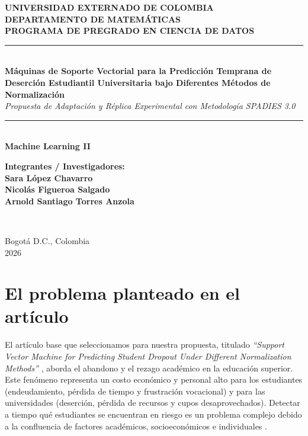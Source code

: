 \documentclass[12pt,a4paper]{article}
\begin{document}
\begin{titlepage}
    \hypersetup{pageanchor=false}
    \centering
    \vspace*{1.0cm}
    
    {\Large \textbf{UNIVERSIDAD EXTERNADO DE COLOMBIA}}\\[0.35cm]
    {\large \textbf{DEPARTAMENTO DE MATEMÁTICAS}}\\[0.25cm]
    {\large \textbf{PROGRAMA DE PREGRADO EN CIENCIA DE DATOS}}\\[2.0cm]
    
    \rule{\linewidth}{0.6mm}\\[0.6cm]
    {\Large \bfseries Máquinas de Soporte Vectorial para la Predicción Temprana de Deserción Estudiantil Universitaria bajo Diferentes Métodos de Normalización}\\[0.5cm]
    {\large \textit{Propuesta de Adaptación y Réplica Experimental con Metodología SPADIES 3.0}}\\[0.5cm]
    \rule{\linewidth}{0.6mm}\\[1.5cm]
    
    {\large \textbf{Machine Learning II}}\\[2.0cm]
    
    \begin{minipage}{0.85\textwidth}
        \centering
        \textbf{\large Integrantes / Investigadores:}\\[0.4cm]
        {\large \textbf{Sara López Chavarro}}\\[0.25cm]
        {\large \textbf{Nicolás Figueroa Salgado}}\\[0.25cm]
        {\large \textbf{Arnold Santiago Torres Anzola}}
    \end{minipage}\\[2.5cm]
    
    \vfill
    
    {\large Bogotá D.C., Colombia}\\[0.2cm]
    {\large 2026}
\end{titlepage}

\hypersetup{pageanchor=true}
\newpage
{}

\section{El problema planteado en el artículo}

El artículo base que seleccionamos para nuestra propuesta, titulado \textit{``Support Vector Machine for Predicting Student Dropout Under Different Normalization Methods''} \cite{boteju2024}, aborda el abandono y el rezago académico en la educación superior. Este fenómeno representa un costo económico y personal alto para los estudiantes (endeudamiento, pérdida de tiempo y frustración vocacional) y para las universidades (deserción, pérdida de recursos y cupos desaprovechados). Detectar a tiempo qué estudiantes se encuentran en riesgo es un problema complejo debido a la confluencia de factores académicos, socioeconómicos e individuales \cite[pág.~8633]{boteju2024}.
\end{document}
